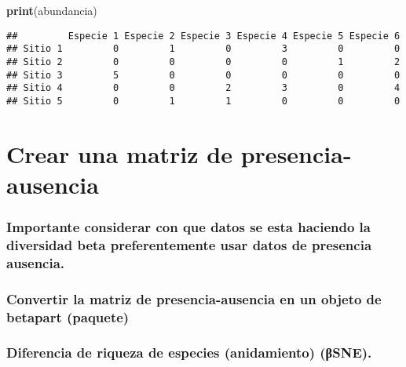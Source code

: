 \documentclass[
]{article}
\newenvironment{Shaded}{\begin{snugshade}}{\end{snugshade}}
\newcommand{\FunctionTok}[1]{\textcolor[rgb]{0.13,0.29,0.53}{\textbf{#1}}}
\newcommand{\NormalTok}[1]{#1}
\begin{document}
\begin{Shaded}
\begin{Highlighting}[]
\FunctionTok{print}\NormalTok{(abundancia)}
\end{Highlighting}
\end{Shaded}

\begin{verbatim}
##         Especie 1 Especie 2 Especie 3 Especie 4 Especie 5 Especie 6
## Sitio 1         0         1         0         3         0         0
## Sitio 2         0         0         0         0         1         2
## Sitio 3         5         0         0         0         0         0
## Sitio 4         0         0         2         3         0         4
## Sitio 5         0         1         1         0         0         0
\end{verbatim}

\hypertarget{crear-una-matriz-de-presencia-ausencia}{%
\section{Crear una matriz de
presencia-ausencia}\label{crear-una-matriz-de-presencia-ausencia}}

\hypertarget{importante-considerar-con-que-datos-se-esta-haciendo-la-diversidad-beta-preferentemente-usar-datos-de-presencia-ausencia.}{%
\subsubsection{Importante considerar con que datos se esta haciendo la
diversidad beta preferentemente usar datos de presencia
ausencia.}\label{importante-considerar-con-que-datos-se-esta-haciendo-la-diversidad-beta-preferentemente-usar-datos-de-presencia-ausencia.}}

\hypertarget{convertir-la-matriz-de-presencia-ausencia-en-un-objeto-de-betapart-paquete}{%
\subsubsection{Convertir la matriz de presencia-ausencia en un objeto de
betapart
(paquete)}\label{convertir-la-matriz-de-presencia-ausencia-en-un-objeto-de-betapart-paquete}}

\hypertarget{diferencia-de-riqueza-de-especies-anidamiento-ux3b2sne.}{%
\subsubsection{\texorpdfstring{Diferencia de riqueza de especies
(anidamiento)
\textbf{(βSNE)}.}{Diferencia de riqueza de especies (anidamiento) (βSNE).}}\label{diferencia-de-riqueza-de-especies-anidamiento-ux3b2sne.}}
\end{document}
